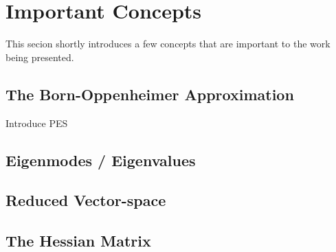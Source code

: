 \section{Important Concepts}
\label{sec:important-concepts}

This secion shortly introduces a few concepts that are important to the work being presented.

\incomplete
\subsection{The Born-Oppenheimer Approximation}
\label{sec:born-oppenheimer}

\bit
\item Introduce PES
\eit

\placeholder

\subsection{Eigenmodes / Eigenvalues}
\label{sec:eigenmodes}

\placeholder

\subsection{Reduced Vector-space}
\label{sec:reduced-space}

\placeholder

\subsection{The Hessian Matrix}
\label{sec:hessian}

